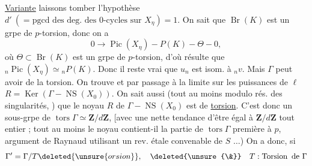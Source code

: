 \uline{Variante} laissons tomber l'hypothèse $d'\ (=\mathrm{pgcd}\text{ des deg. des 0-cycles sur }X_\eta)=1$.
On sait que $\operatorname{Br}(K)$ est un grpe de $p$-torsion, donc on a
\[
0\longrightarrow\operatorname{Pic}(X_\eta)\mathbin{-}P(K)\mathbin{-}\Theta\mathbin{-}0,
\]
où $\Theta\subset\operatorname{Br}(K)$ est un grpe de $p$-torsion, d'où résulte que ${}_n\operatorname{Pic}(X_\eta)\simeq{}_nP(K)$. Donc il reste vrai que $u_n$ est isom. à ${}_nv$. Mais $\Gamma$ peut avoir de la torsion. On trouve
 et par passage à la limite sur les puissances de $\ell$
$R=\operatorname{Ker}(\Gamma\mathbin{-}\operatorname{NS}(X_0))$.
On sait aussi (tout au moins modulo rés. des singularités, ) que le noyau $R$ de $\Gamma\mathbin{-}\operatorname{NS}(X_0)$ est de \uline{torsion}.  C'est donc un sous-grpe de $\operatorname{tors}\Gamma\simeq\mathbf Z/d\mathbf Z$, [avec une nette tendance d'être égal à $\mathbf Z/d\mathbf Z$ tout entier ;  tout au moins le noyau contient-il la partie de $\operatorname{tors}\Gamma$ première à $p$,  argument de Raynaud utilisant un rev. étale convenable de $S$ $\ldots$) On a donc, si
\[
\Gamma'=\Gamma/T\deleted{\unsure{orsion}},\quad\deleted{\unsure{\&}}\quad T:\operatorname{Torsion}\text{ de }\Gamma
\]
